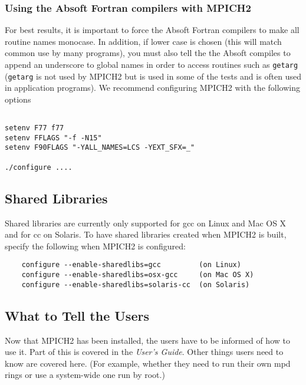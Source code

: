 \documentclass[dvipdfm,11pt]{article}
\begin{document}
\subsubsection{Using the Absoft Fortran compilers with MPICH2}
\label{sec:absoft}

For best results, it is important to force the Absoft Fortran compilers to 
make all routine names monocase.  In addition, if lower case is chosen 
(this will match common use by many programs), you must also tell the the 
Absoft compiles to append an underscore to global names in order to access 
routines such as \texttt{getarg} (\texttt{getarg} is not used by MPICH2 but is
used in some 
of the tests and is often used in application programs).  We recommend 
configuring MPICH2 with the following options
\begin{verbatim}

setenv F77 f77
setenv FFLAGS "-f -N15"
setenv F90FLAGS "-YALL_NAMES=LCS -YEXT_SFX=_"

./configure ....

\end{verbatim}




\subsection{Shared Libraries}
\label{sec:shared-libraries}

Shared libraries are currently only supported for gcc on Linux and
Mac OS X and for cc on Solaris. To have shared libraries created when
MPICH2 is built, specify the following when MPICH2 is configured:
\begin{verbatim}
    configure --enable-sharedlibs=gcc         (on Linux)
    configure --enable-sharedlibs=osx-gcc     (on Mac OS X)
    configure --enable-sharedlibs=solaris-cc  (on Solaris)
\end{verbatim}




\subsection{What to Tell the Users}
\label{sec:telling}

Now that MPICH2 has been installed, the users have to be informed of how
to use it.  Part of this is covered in the \emph{User's Guide}.  Other
things users need to know are covered here.  (For example, whether they need to
run their own mpd rings or use a system-wide one run by root.)
\end{document}
